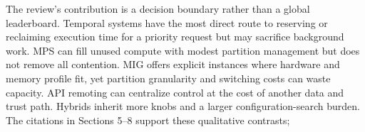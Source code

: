 The review's contribution is a decision boundary rather than a global leaderboard. Temporal systems have the most direct route to reserving or reclaiming execution time for a priority request but may sacrifice background work. MPS can fill unused compute with modest partition management but does not remove all contention. MIG offers explicit instances where hardware and memory profile fit, yet partition granularity and switching costs can waste capacity. API remoting can centralize control at the cost of another data and trust path. Hybrids inherit more knobs and a larger configuration-search burden. The citations in Sections 5--8 support these qualitative contrasts; 
